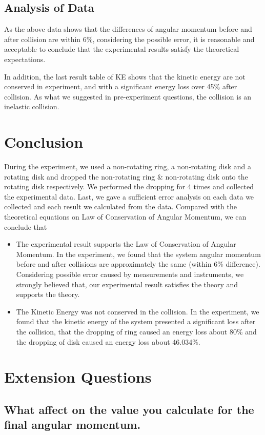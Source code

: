 \documentclass[12pt]{article}
\begin{document}
	\subsection{Analysis of Data}
	As the above data shows that the differences of angular momentum before and after collision are within 6\%, considering the possible error, it is reasonable and acceptable to conclude that the experimental results satisfy the theoretical expectations. \par
	In addition, the last result table of KE shows that the kinetic energy are not conserved in experiment, and with a significant energy loss over 45\% after collision. As what we suggested in pre-experiment questions, the collision is an inelastic collision.
	
	\section{Conclusion}
	During the experiment, we used a non-rotating ring, a non-rotating disk and a rotating disk and dropped the non-rotating ring \& non-rotating disk onto the rotating disk respectively. We performed the dropping for 4 times and collected the experimental data. Last, we gave a sufficient error analysis on each data we collected and each result we calculated from the data. Compared with the theoretical equations on Law of Conservation of Angular Momentum, we can conclude that
	\begin{itemize}
		\item The experimental result supports the Law of Conservation of Angular Momentum. In the experiment, we found that the system angular momentum before and after collisions are approximately the same (within 6\% difference). Considering possible error caused by measurements and instruments, we strongly believed that, our experimental result satisfies the theory and supports the theory.
		\item The Kinetic Energy was not conserved in the collision. In the experiment, we found that the kinetic energy of the system presented a significant loss after the collision, that the dropping of ring caused an energy loss about 80\% and the dropping of disk caused an energy loss about 46.034\%.
	\end{itemize}
	
	\section{Extension Questions}
	\subsection{What affect on the value you calculate for the final angular momentum.}
\end{document}
